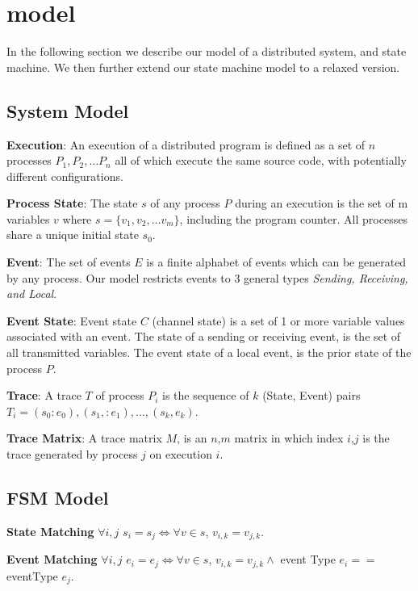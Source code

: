 \section{model}
\label{sec:model}

In the following section we describe our model of a distributed system, and
state machine. We then further extend our state machine model to a relaxed
version.


\subsection{System Model}

\noindent\textbf{Execution}: An execution of a distributed program is defined as a set
of $n$ processes $P_1, P_2, \dots P_n$ all of which execute the same source
code, with potentially different configurations.

\noindent\textbf{Process State}: The state $s$ of any process $P$ during an
execution is the set of m variables $v$ where $s = \{ v_1, v_2, \dots v_m \}$,
including the program counter.  All processes share a unique initial state
$s_0$.

\noindent\textbf{Event}: The set of events $E$ is a finite alphabet of events which can
be generated by any process. Our model restricts events to 3 general types
\textit{Sending, Receiving, and Local}.

\noindent\textbf{Event State}: Event state $C$ (channel state) is a set of 1 or more
variable values associated with an event. The state of a sending or receiving
event, is the set of all transmitted variables. The event state of a local
event, is the prior state of the process $P$.

\noindent\textbf{Trace}: A trace $T$ of process $P_i$ is the sequence of $k$ (State,
Event) pairs $T_i = {(s_0:e_0),(s_1,:e_1), \dots ,(s_k,e_k)}$.

\noindent\textbf{Trace Matrix}: A trace matrix $M$, is an $n$,$m$ matrix in which index
$i$,$j$ is the trace generated by process $j$ on execution $i$.

\subsection{FSM Model}

\noindent\textbf{State Matching} $\forall i,j$ $s_i = s_j \iff \forall v \in s$, $v_{i,k} = v_{j,k}$.

\noindent\textbf{Event Matching} $\forall i,j$ $e_i = e_j \iff \forall v \in s$, $v_{i,k} = v_{j,k} \wedge$ event Type $e_i == $ eventType $e_j$.

